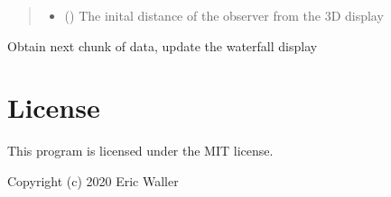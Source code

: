 \documentclass[letterpaper,10pt,english]{sphinxmanual}
\begin{document}
\begin{fulllineitems}
\begin{quote}
\begin{description}
\begin{itemize}
\item {} 
 () \textendash{} The inital distance of the observer from the
3D display

\end{itemize}

\end{description}\end{quote}

\begin{fulllineitems}
\label{\detokenize{index:ThreeDGraph.Graph.np}}
\end{fulllineitems}


\begin{fulllineitems}
\label{\detokenize{index:ThreeDGraph.Graph.pg}}
\end{fulllineitems}


\begin{fulllineitems}
\label{\detokenize{index:ThreeDGraph.Graph.update}}
Obtain next chunk of data, update the waterfall display

\end{fulllineitems}


\end{fulllineitems}



\chapter{License}
\label{\detokenize{index:license}}
This program is licensed under the MIT license.

Copyright (c) 2020 Eric Waller
\end{document}
